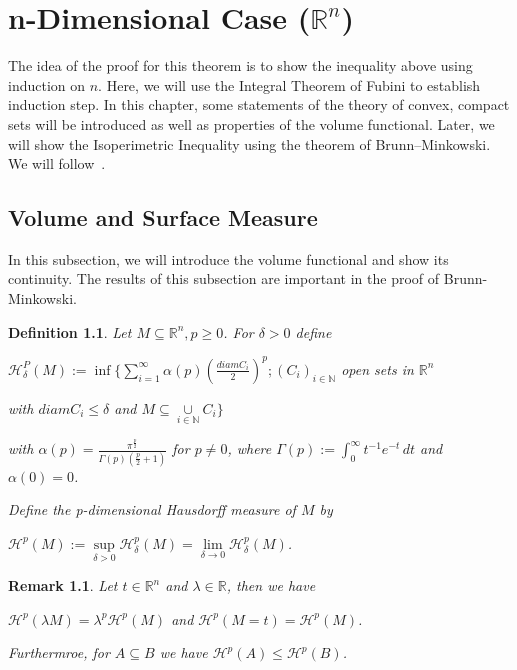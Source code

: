\documentclass[a4paper]{book}
\newtheorem{remark}[theorem]{Remark}%
\newtheorem{definition}[theorem]{Definition}%
\numberwithin{theorem}{section}%
\begin{document}
\chapter{n-Dimensional Case ($\mathbb{R}^n$)}
The idea of the proof for this theorem is to show the inequality above using induction on $n$. Here, we will use the Integral Theorem of Fubini to establish induction step. In this chapter, some statements of the theory of convex, compact sets will be introduced as well as properties of the volume functional. Later, we will show the Isoperimetric Inequality using the theorem of Brunn–Minkowski. We will follow~\citep{schneider2014convex}.

\section{Volume and Surface Measure}
In this subsection, we will introduce the volume functional and show its continuity. The results of this subsection are important in the proof of Brunn-Minkowski.~\citep{gehring2019isoperimetric}

\begin{definition}
    Let $M\subseteq\mathbb{R}^{n}, p\geq0$. For $\delta>0$ define
    \begin{center}
        $\displaystyle \mathscr{H}_{\delta}^{P}(M):=\inf\{\sum\limits_{i=1}^{\infty}\alpha(p)(\frac{diam C_{i}}{2})^{p};(C_{i})_{i\in\mathbb{N}}$ open sets in $\mathbb{R}^n$

        \hspace{1cm}with $diam C_{i}\leq\delta$ and $M\subseteq\underset{i\in\mathbb{N}}{\cup}{C_{i}}\}$
    \end{center}
    with $\displaystyle \alpha(p)=\frac{\pi^{\frac{p}{2}}}{\Gamma(p)(\frac{p}{2}+1)}$ for $p\neq0$, where $\Gamma(p):=\int_{0}^{\infty}t^{-1}e^{-t}\,dt$ and $\alpha(0)=0$.
    
    Define the p-dimensional Hausdorff measure of $M$ by
    \begin{center}
        $\displaystyle \mathscr{H}^{p}(M):=\underset{\delta>0}{\sup}\mathscr{H}_{\delta}^{p}(M)=\underset{\delta\to0}{\lim}\mathscr{H}_{\delta}^{p}(M)$.
    \end{center}
\end{definition}

\begin{remark}
    Let $t\in\mathbb{R}^{n}$ and $\lambda\in\mathbb{R}$, then we have
    \begin{center}
        $\displaystyle \mathscr{H}^{p}(\lambda M)=\lambda^{p}\mathscr{H}^{p}(M)$ and $\mathscr{H}^{p}(M=t)=\mathscr{H}^{p}(M)$.
    \end{center}
    Furthermroe, for $A\subseteq B$ we have $\mathscr{H}^{p}(A)\leq\mathscr{H}^{p}(B)$.
\end{remark}
\end{document}
